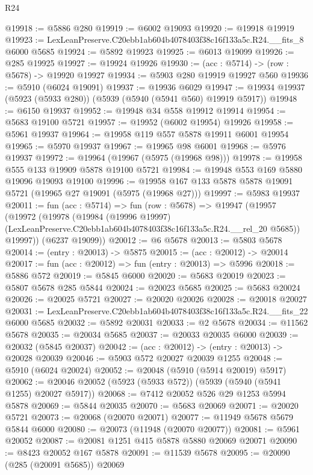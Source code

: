 \begin{lexlean}{R24}
\begin{coremodule}
@19918 := @5886 @280
@19919 := @6002 @19093
@19920 := @19918 @19919
@19923 := LexLeanPreserve.C20ebb1ab604b4078403f38c16f133a5c.R24.__fits_8 @6000 @5685
@19924 := @5892 @19923
@19925 := @6013 @19099
@19926 := @285 @19925
@19927 := @19924 @19926
@19930 := (acc : @5714) -> (row : @5678) -> @19920 @19927
@19934 := @5903 @280 @19919 @19927 @560
@19936 := @5910 (@6024 @19091)
@19937 := @19936 @6029
@19947 := @19934 @19937 (@5923 (@5933 @280)) (@5939 (@5940 (@5941 @560) @19919 @5917))
@19948 := @6150 @19937
@19952 := @19948 @34 @558 @19912 @19914
@19954 := @5683 @19100 @5721
@19957 := @19952 (@6002 @19954) @19926
@19958 := @5961 @19937
@19964 := @19958 @119 @557 @5878 @19911 @6001 @19954
@19965 := @5970 @19937
@19967 := @19965 @98 @6001
@19968 := @5976 @19937
@19972 := @19964 (@19967 (@5975 (@19968 @98)))
@19978 := @19958 @555 @133 @19909 @5878 @19100 @5721
@19984 := @19948 @553 @169 @5880 @19096 @19093 @19100
@19996 := @19958 @167 @133 @5878 @5878 @19091 @5721 (@19965 @27 @19091 (@5975 (@19968 @27)))
@19997 := @5983 @19937
@20011 := fun (acc : @5714) =>
  fun (row : @5678) =>
  @19947
    (@19957
      (@19972
        (@19978
          (@19984
            (@19996 @19997)
            (LexLeanPreserve.C20ebb1ab604b4078403f38c16f133a5c.R24.__rel_20 @5685))
          @19997))
      (@6237 @19099))
@20012 := @6 @5678
@20013 := @5803 @5678
@20014 := (entry : @20013) -> @5875
@20015 := (acc : @20012) -> @20014
@20017 := fun (acc : @20012) => fun (entry : @20013) => @5996
@20018 := @5886 @572
@20019 := @5845 @6000
@20020 := @5683 @20019
@20023 := @5807 @5678 @285 @5844
@20024 := @20023 @5685
@20025 := @5683 @20024
@20026 := @20025 @5721
@20027 := @20020 @20026
@20028 := @20018 @20027
@20031 := LexLeanPreserve.C20ebb1ab604b4078403f38c16f133a5c.R24.__fits_22 @6000 @5685
@20032 := @5892 @20031
@20033 := @2 @5678
@20034 := @11562 @5678
@20035 := @20034 @5685
@20037 := @20033 @20035 @6000
@20039 := @20032 (@5845 @20037)
@20042 := (acc : @20012) -> (entry : @20013) -> @20028 @20039
@20046 := @5903 @572 @20027 @20039 @1255
@20048 := @5910 (@6024 @20024)
@20052 := @20048 (@5910 (@5914 @20019) @5917)
@20062 := @20046 @20052 (@5923 (@5933 @572)) (@5939 (@5940 (@5941 @1255) @20027 @5917))
@20068 := @7412 @20052 @526 @29 @1253 @5994 @5878
@20069 := @5844 @20035
@20070 := @5683 @20069
@20071 := @20020 @5721
@20073 := @20068 (@20070 @20071)
@20077 := @11949 @5678 @5679 @5844 @6000
@20080 := @20073 (@11948 (@20070 @20077))
@20081 := @5961 @20052
@20087 := @20081 @1251 @415 @5878 @5880 @20069 @20071
@20090 := @8423 @20052 @167 @5878
@20091 := @11539 @5678
@20095 := @20090 (@285 (@20091 @5685)) @20069

\end{coremodule}
\end{lexlean}
